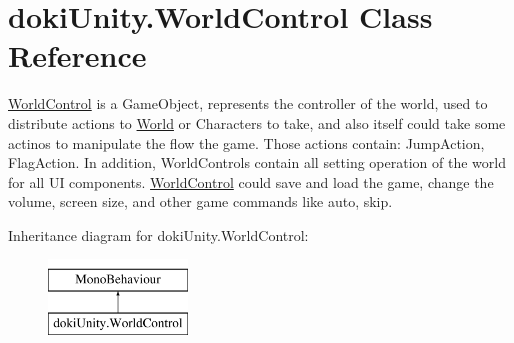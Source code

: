 \hypertarget{classdoki_unity_1_1_world_control}{}\section{doki\+Unity.\+World\+Control Class Reference}
\label{classdoki_unity_1_1_world_control}


\hyperlink{classdoki_unity_1_1_world_control}{World\+Control} is a Game\+Object, represents the controller of the world, used to distribute actions to \hyperlink{classdoki_unity_1_1_world}{World} or Characters to take, and also itself could take some actinos to manipulate the flow the game. Those actions contain\+: Jump\+Action, Flag\+Action. In addition, World\+Controls contain all setting operation of the world for all UI components. \hyperlink{classdoki_unity_1_1_world_control}{World\+Control} could save and load the game, change the volume, screen size, and other game commands like auto, skip.  


Inheritance diagram for doki\+Unity.\+World\+Control\+:\begin{figure}[H]
\begin{center}
\leavevmode
\includegraphics[height=2.000000cm]{classdoki_unity_1_1_world_control}
\end{center}
\end{figure}
